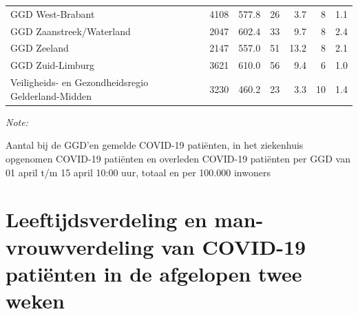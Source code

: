 \documentclass[
  english,
  man,floatsintext]{apa6}
\begin{document}
\begin{table}
\begin{threeparttable}
\begin{tabular}{lrrrrrr}
GGD West-Brabant & 4108 & 577.8 & 26 & 3.7 & 8 & 1.1\\
GGD Zaanstreek/Waterland & 2047 & 602.4 & 33 & 9.7 & 8 & 2.4\\
GGD Zeeland & 2147 & 557.0 & 51 & 13.2 & 8 & 2.1\\
GGD Zuid-Limburg & 3621 & 610.0 & 56 & 9.4 & 6 & 1.0\\
Veiligheids- en Gezondheidsregio Gelderland-Midden & 3230 & 460.2 & 23 & 3.3 & 10 & 1.4\\
\bottomrule
\end{tabular}
\begin{tablenotes}
\item \textit{Note: } 
\item Aantal bij de GGD’en gemelde COVID-19 patiënten, in het ziekenhuis opgenomen COVID-19 patiënten en overleden COVID-19 patiënten per GGD van 01 april t/m 15 april 10:00 uur, totaal en per 100.000 inwoners
\end{tablenotes}
\end{threeparttable}
\endgroup{}
\end{table}

\newpage

\hypertarget{leeftijdsverdeling-en-man-vrouwverdeling-van-covid-19-patiuxebnten-in-de-afgelopen-twee-weken}{%
\section{Leeftijdsverdeling en man-vrouwverdeling van COVID-19 patiënten in de afgelopen twee weken}\label{leeftijdsverdeling-en-man-vrouwverdeling-van-covid-19-patiuxebnten-in-de-afgelopen-twee-weken}}
\end{document}
